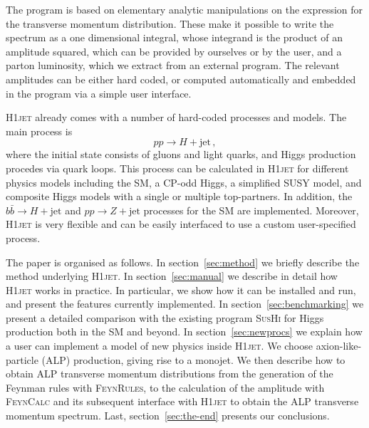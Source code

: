 \documentclass[12pt]{article}
\begin{document}
The program is based on elementary analytic manipulations on the expression
for the transverse momentum distribution. These make it possible to
write the spectrum as a one dimensional integral, whose integrand is
the product of an amplitude squared, which can be provided by ourselves or by the user, and a parton luminosity, which we extract from an external
program. The relevant amplitudes can be
either hard coded, or computed automatically and embedded in the program
via a simple user interface.

\textsc{H1jet} already comes with a number of hard-coded processes and models. 
The main process is 
\begin{equation}
    pp \to H + \mathrm{jet} \,, 
\end{equation}
where the initial state consists of gluons and light quarks, and Higgs
production procedes via quark loops. This process can be calculated in
\textsc{H1jet} for different physics models including the SM, a CP-odd
Higgs, a simplified SUSY model, and composite Higgs models with a
single or multiple top-partners. In addition, the
$b\bar{b} \to H + \mathrm{jet}$ and $pp \to Z + \mathrm{jet}$
processes for the SM are implemented. Moreover, \textsc{H1jet} is very
flexible and can be easily interfaced to use a custom user-specified
process.

The paper is organised as follows. In section~\ref{sec:method} we
briefly describe the method underlying \textsc{H1jet}. In
section~\ref{sec:manual} we describe in detail how \textsc{H1jet}
works in practice. In particular, we show how it can be installed and
run, and present the features currently implemented. In
section~\ref{sec:benchmarking} we present a detailed comparison with
the existing program \textsc{SusHi} for Higgs production both in the
SM and beyond. In section~\ref{sec:newprocs} we explain how a user can
implement a model of new physics inside \textsc{H1jet}. We choose
axion-like-particle (ALP) production, giving rise to a monojet. We
then describe how to obtain ALP transverse momentum distributions from
the generation of the Feynman rules with \textsc{FeynRules}, to the
calculation of the amplitude with \textsc{FeynCalc} and its subsequent
interface with \textsc{H1jet} to obtain the ALP transverse momentum
spectrum. Last, section~\ref{sec:the-end} presents our conclusions.
\end{document}
